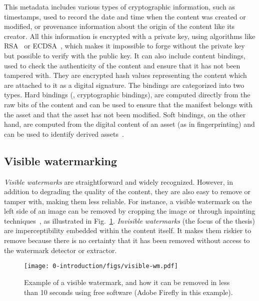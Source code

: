 This metadata includes various types of cryptographic information, such as timestamps, used to record the date and time when the content was created or modified, or provenance information about the origin of the content like its creator.
All this information is encrypted with a private key, using algorithms like \Gls*{RSA}~\citep{rivest1978method} or ECDSA~\citep{johnson2001elliptic}, which makes it impossible to forge without the private key but possible to verify with the public key.
It can also include content bindings, used to check the authenticity of the content and ensure that it has not been tampered with.
They are encrypted hash values representing the content which are attached to it as a digital signature.
The bindings are categorized into two types. 
Hard bindings (\aka, cryptographic bindings), are computed directly from the raw bits of the content and can be used to ensure that the manifest belongs with the asset and that the asset has not been modified.
Soft bindings, on the other hand, are computed from the digital content of an asset (as in fingerprinting) and can be used to identify derived assets~\citep{c2pa}.


\subsection{Visible \gls*{watermarking}}

\emph{Visible watermarks} are straightforward and widely recognized. 
However, in addition to degrading the quality of the content, they are also easy to remove or tamper with, making them less reliable.
For instance, a visible watermark on the left side of an image can be removed by cropping the image or through inpainting techniques~\citep{dekel2017effectiveness}, as illustrated in Fig.~\ref{chap0/fig:visible-watermarking}.
\emph{Invisible watermarks} (the focus of the thesis) are imperceptibility embedded within the content itself.
It makes them riskier to remove because there is no certainty that it has been removed without access to the watermark detector or extractor.

\begin{figure}[h!]
    \centering
    \texttt{[image: 0-introduction/figs/visible-wm.pdf]}
    \caption{Example of a visible watermark, and how it can be removed in less than 10 seconds using free software (Adobe Firefly in this example).}
    \label{chap0/fig:visible-watermarking}
\end{figure}





















